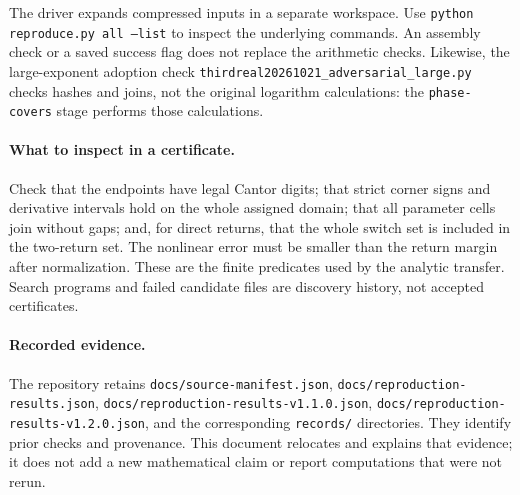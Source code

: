 \documentclass[11pt,a4paper]{article}
\begin{document}
The driver expands compressed inputs in a separate workspace. Use
\texttt{python reproduce.py all --list} to inspect the underlying commands.
An assembly check or a saved success flag does not replace the arithmetic
checks. Likewise, the large-exponent adoption check
\nolinkurl{thirdreal20261021_adversarial_large.py} checks hashes and joins,
not the original logarithm calculations: the \texttt{phase-covers} stage
performs those calculations.

\paragraph{What to inspect in a certificate.}
Check that the endpoints have legal Cantor digits; that strict corner
signs and derivative intervals hold on the whole assigned domain; that
all parameter cells join without gaps; and, for direct returns, that the
whole switch set is included in the two-return set. The nonlinear error
must be smaller than the return margin after normalization. These are
the finite predicates used by the analytic transfer. Search programs and
failed candidate files are discovery history, not accepted certificates.

\paragraph{Recorded evidence.}
The repository retains \nolinkurl{docs/source-manifest.json},
\nolinkurl{docs/reproduction-results.json},
\nolinkurl{docs/reproduction-results-v1.1.0.json},
\nolinkurl{docs/reproduction-results-v1.2.0.json}, and the corresponding
\texttt{records/} directories. They identify prior checks and provenance.
This document relocates and explains that evidence; it does not add a new
mathematical claim or report computations that were not rerun.
\end{document}
